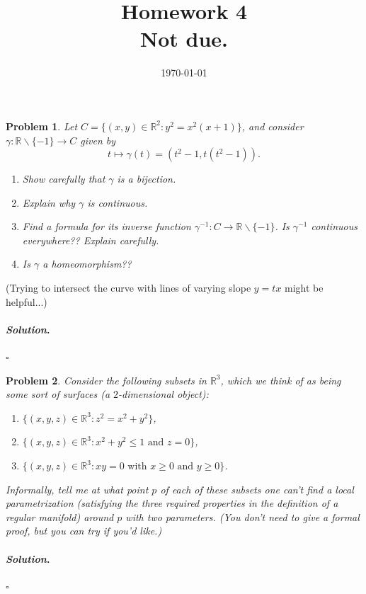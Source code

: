 \documentclass[reqno]{amsart}
\theoremstyle{plain}
\newtheorem{problem}{Problem}
\theoremstyle{definition}
\newenvironment{solution}{\paragraph{\emph{Solution}.}}{\hfill$\square$}
\begin{document}
 

\title[Homework 4]{Homework 4 \\ Not due.}

\date{\today} 
\maketitle 


\begin{problem}
Let $C = \{(x,y) \in \mathbb{R}^{2} : y^{2} = x^{2}(x+1) \}$, and consider $\gamma: \mathbb{R} \smallsetminus \{ -1\} \rightarrow C$ given by
$$t \mapsto \gamma(t) = (t^{2} - 1,t(t^{2} -1)). $$
\begin{enumerate}
\item Show carefully that $\gamma$ is a bijection.
\item Explain why $\gamma$ is continuous.
\item Find a formula for its inverse function $\gamma^{-1}:C \rightarrow \mathbb{R} \smallsetminus \{ -1\}$.  Is $\gamma^{-1}$ continuous everywhere??  Explain carefully.
\item Is $\gamma$ a homeomorphism??
\end{enumerate}
\end{problem}
(Trying to intersect the curve with lines of varying slope $y = tx$ might be helpful...)
\begin{solution}

\end{solution}

\begin{problem}
Consider the following subsets in $\mathbb{R}^{3}$, which we think of as being some sort of surfaces (a $2$-dimensional object):
\begin{enumerate}
\item $\{(x,y,z) \in \mathbb{R}^{3}:  z^{2} = x^{2} + y^{2} \}$,
\item $\{(x,y,z) \in \mathbb{R}^{3}: x^{2} + y^{2} \le 1 \text{ and } z=0\}$,
\item $\{(x,y,z) \in \mathbb{R}^{3}: xy=0 \text{ with } x \ge 0 \text{ and } y \ge 0\}$.
\end{enumerate}
Informally, tell me at what point $p$ of each of these subsets one can't find a local parametrization (satisfying the three required properties in the definition of a regular manifold) around $p$ with two parameters.  (You don't need to give a formal proof, but you can try if you'd like.)
\end{problem}
\begin{solution}

\end{solution}
\end{document}
